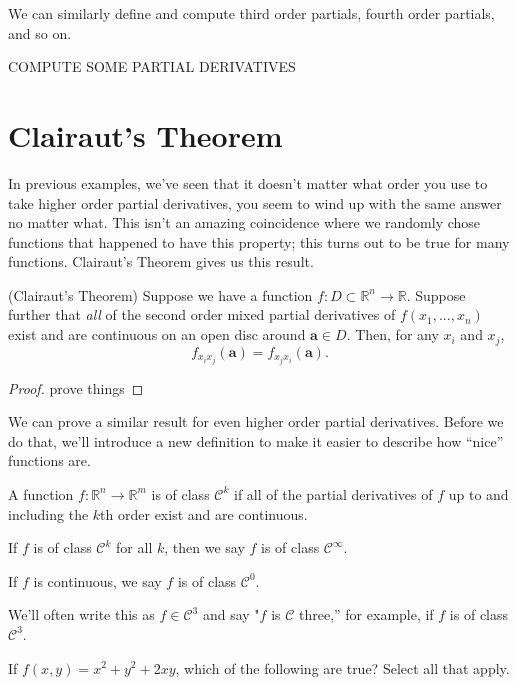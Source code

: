 \documentclass{ximera}
\begin{document}
We can similarly define and compute third order partials, fourth order partials, and so on.

\begin{example}
COMPUTE SOME PARTIAL DERIVATIVES
\end{example}

\section*{Clairaut's Theorem}

In previous examples, we've seen that it doesn't matter what order you use to take higher order partial derivatives, you seem to wind up with the same answer no matter what. This isn't an amazing coincidence where we randomly chose functions that happened to have this property; this turns out to be true for many functions. Clairaut's Theorem gives us this result.

\begin{theorem}
(Clairaut's Theorem) Suppose we have a function $f:D\subset \mathbb{R}^n\rightarrow \mathbb{R}$. Suppose further that \emph{all} of the second order mixed partial derivatives of $f(x_1,...,x_n)$ exist and are continuous on an open disc around $\mathbf{a}\in D$. Then, for any $x_i$ and $x_j$,
\[
f_{x_ix_j}(\mathbf{a})=f_{x_jx_i}(\mathbf{a}).
\]
\end{theorem}

\begin{proof}
prove things
\end{proof}

We can prove a similar result for even higher order partial derivatives. Before we do that, we'll introduce a new definition to make it easier to describe how ``nice'' functions are.

\begin{definition}
A function $f:\mathbb{R}^n\rightarrow\mathbb{R}^m$ is of class $\mathcal{C}^k$ if all of the partial derivatives of $f$ up to and including the $k$th order exist and are continuous.

If $f$ is of class $\mathcal{C}^k$ for all $k$, then we say $f$ is of class $\mathcal{C}^\infty$.

If $f$ is continuous, we say $f$ is of class $\mathcal{C}^0$.
\end{definition}

We'll often write this as $f\in\mathcal{C}^3$ and say "$f$ is $\mathcal{C}$ three,'' for example, if $f$ is of class $\mathcal{C}^3$.

\begin{problem}
If $f(x,y) = x^2+y^2+2xy$, which of the following are true? Select all that apply.
\begin{selectAll}
\end{selectAll}
\end{problem}
\end{document}
